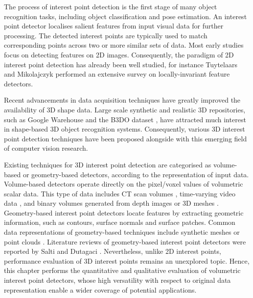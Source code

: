 The process of interest point detection is the first stage of many object recognition tasks, including object classification and pose estimation. An interest point detector localises salient features from input visual data for further processing. The detected interest points are typically used to match corresponding points across two or more similar sets of data. 
Most early studies focus on detecting features on 2D images. Consequently, the paradigm of 2D interest point detection has already been well studied, for instance Tuytelaars and Mikolajczyk \cite{Tuytelaars2008} performed an extensive survey on locally-invariant feature detectors.  

Recent advancements in data acquisition techniques have greatly improved the availability of 3D shape data. Large scale synthetic and realistic 3D repositories, such as Google Warehouse \cite{Lai2010} and the B3DO dataset \cite{Janoch2011}, have attracted much interest in shape-based 3D object recognition systems. Consequently, various 3D interest point detection techniques have been proposed alongside with this emerging field of computer vision research. 

Existing techniques for 3D interest point detection are categorised as volume-based or geometry-based detectors, according to the representation of input data. Volume-based detectors operate directly on the pixel/voxel values of volumetric scalar data. This type of data includes CT scan volumes \cite{Flitton2010}, time-varying video data \cite{Koelstra2009, Laptev2005, Willems2008, Yu2010}, and binary volumes generated from depth images or 3D meshes \cite{Viksten2008, Knopp2010}.  
Geometry-based interest point detectors locate features by extracting geometric information, such as contours, surface normals and surface patches. 
Common data representations of geometry-based techniques include synthetic meshes \cite{Glomb2009,Sipiran2011,Zaharescu2009} or point clouds \cite{Unnikrishnan2008,Aanaes2012}. 
Literature reviews of geometry-based interest point detectors were reported by Salti \etal \cite{Salti2011} and Dutagaci \etal \cite{Dutagaci2011}.  
Nevertheless, unlike 2D interest points, performance evaluation of 3D interest points remains an unexplored topic. 
Hence, this chapter performs the quantitative and qualitative evaluation of volumetric interest point detectors, whose high versatility with respect to original data representation enable a wider coverage of potential applications.


